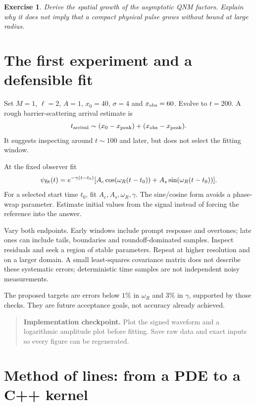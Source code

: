 \documentclass[11pt,a4paper]{article}
\numberwithin{equation}{section}
\newtheorem{exercise}{Exercise}[section]
\newenvironment{checkpoint}{\begin{quote}\small\textbf{Implementation checkpoint.} }{\end{quote}}
\begin{document}
\begin{exercise}
Derive the spatial growth of the asymptotic QNM factors. Explain why it
does not imply that a compact physical pulse grows without bound at large
radius.
\end{exercise}

\section{The first experiment and a defensible fit}\label{sec:experiment}

Set $M=1$, $\ell=2$, $A=1$, $x_0=40$, $\sigma=4$ and $x_{\rm obs}=60$.
Evolve to $t=200$. A rough barrier-scattering arrival estimate is
\begin{equation}
 t_{\rm arrival}\sim(x_0-x_{\rm peak})+(x_{\rm obs}-x_{\rm peak}).
\end{equation}
It suggests inspecting around $t\sim100$ and later, but does not select the
fitting window.

At the fixed observer fit
\begin{equation}\label{eq:fit}
 \psi_{\rm fit}(t)=e^{-\gamma(t-t_0)}
 [A_c\cos(\omega_R(t-t_0))+A_s\sin(\omega_R(t-t_0))].
\end{equation}
For a selected start time $t_0$, fit $A_c,A_s,\omega_R,\gamma$.
The sine/cosine form avoids a phase-wrap parameter. Estimate initial values
from the signal instead of forcing the reference into the answer.

Vary both endpoints. Early windows include prompt response and overtones;
late ones can include tails, boundaries and roundoff-dominated samples.
Inspect residuals and seek a region of stable parameters. Repeat at higher
resolution and on a larger domain. A small least-squares covariance matrix
does not describe these systematic errors; deterministic time samples are
not independent noisy measurements.

The proposed targets are errors below $1\%$ in $\omega_R$ and $3\%$ in
$\gamma$, supported by those checks. They are future acceptance goals,
not accuracy already achieved.

\begin{checkpoint}
Plot the signed waveform and a logarithmic amplitude plot before fitting.
Save raw data and exact inputs so every figure can be regenerated.
\end{checkpoint}

\section{Method of lines: from a PDE to a C++ kernel}\label{sec:mol}
\end{document}
